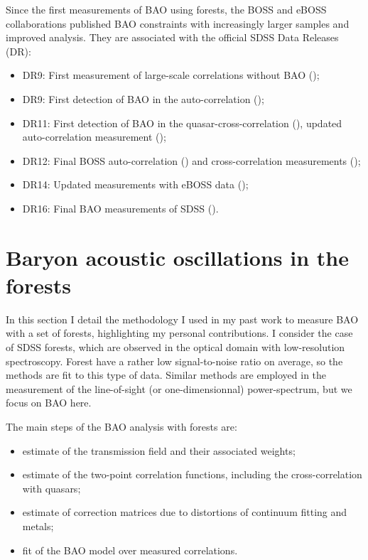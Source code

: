 Since the first measurements of BAO using forests, the BOSS and eBOSS collaborations 
published BAO constraints with increasingly larger samples and improved analysis.
They are associated with the official SDSS Data Releases (DR):
\begin{itemize}
 \item DR9: First measurement of large-scale \lya correlations without BAO (\cite{slosarLymanAlphaForest2011}); 
 \item DR9: First detection of BAO in the \lya auto-correlation 
            (\cite{buscaBaryonAcousticOscillations2013, slosarMeasurementBaryonAcoustic2013, kirkbyFittingMethodsBaryon2013});
 \item DR11: First detection of BAO in the quasar-\lya cross-correlation (\cite{font-riberaQuasarLymanAlphaForest2014}), 
             updated auto-correlation measurement (\cite{delubacBaryonAcousticOscillations2015});
 \item DR12: Final BOSS auto-correlation (\cite{bautistaMeasurementBaryonAcoustic2017}) 
             and cross-correlation measurements (\cite{dumasdesbourbouxBaryonAcousticOscillations2017});
 \item DR14: Updated measurements with eBOSS data (\cite{desainteagatheBaryonAcousticOscillations2019, blomqvistBaryonAcousticOscillations2019});
 \item DR16: Final \lya BAO measurements of SDSS (\cite{dumasdesbourbouxhelionCompletedSDSSIVExtended2020}).
\end{itemize}

\section{Baryon acoustic oscillations in the forests}
\label{forests:bao}

In this section I detail the methodology I used in my past work 
to measure BAO with a set of \lya forests, highlighting my 
personal contributions. I consider the case of SDSS forests, 
which are observed in the optical domain with low-resolution spectroscopy.
Forest have a rather low signal-to-noise ratio on average, 
so the methods are fit to this type of data. 
Similar methods are employed in the measurement of the line-of-sight
(or one-dimensionnal) power-spectrum, but we focus on BAO here. 

The main steps of the BAO analysis with \lya forests are:
\begin{itemize}
    \item estimate of the transmission field and their associated weights;
    \item estimate of the two-point correlation functions, including the cross-correlation with quasars;
    \item estimate of correction matrices due to distortions of continuum fitting and metals; 
    \item fit of the BAO model over measured correlations.
\end{itemize}

